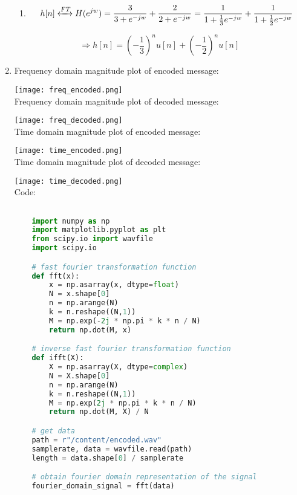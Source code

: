 \documentclass[10pt,a4paper, margin=1in]{article}
\begin{document}
\begin{enumerate}
\begin{enumerate}
	\item %
\[ h[n] \xleftrightarrow{FT} H(e^{jw}) = \frac{3}{3+e^{-jw}} + \frac{2}{ 2+e^{-jw} } = \frac{1}{ 1 + \frac{1}{3}e^{-jw} } + \frac{1}{ 1 + \frac{1}{2}e^{-jw} }  \]

    \end{enumerate}
\[ \Rightarrow h[n] = (-\frac{1}{3})^{n}u[n] + (-\frac{1}{2})^{n}u[n]  \]
\item %

    Frequency domain magnitude plot of encoded message:

    \texttt{[image: freq\_encoded.png]}\\

    Frequency domain magnitude plot of decoded message:

    \texttt{[image: freq\_decoded.png]}\\

    Time domain magnitude plot of encoded message:

    \texttt{[image: time\_encoded.png]}\\

    Time domain magnitude plot of decoded message:

    \texttt{[image: time\_decoded.png]}\\

    Code:\\

    \begin{lstlisting}[language=Python]

    import numpy as np
    import matplotlib.pyplot as plt
    from scipy.io import wavfile
    import scipy.io

    # fast fourier transformation function
    def fft(x):
        x = np.asarray(x, dtype=float)
        N = x.shape[0]
        n = np.arange(N)
        k = n.reshape((N,1))
        M = np.exp(-2j * np.pi * k * n / N)
        return np.dot(M, x)

    # inverse fast fourier transformation function
    def ifft(X):
        X = np.asarray(X, dtype=complex)
        N = X.shape[0]
        n = np.arange(N)
        k = n.reshape((N,1))
        M = np.exp(2j * np.pi * k * n / N)
        return np.dot(M, X) / N

    # get data
    path = r"/content/encoded.wav"
    samplerate, data = wavfile.read(path)
    length = data.shape[0] / samplerate

    # obtain fourier domain representation of the signal
    fourier_domain_signal = fft(data)


\end{lstlisting}
\end{enumerate}
\end{document}
